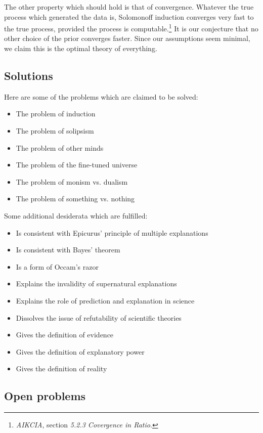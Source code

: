 The other property which should hold is that of convergence.
Whatever the true process which generated the data is, Solomonoff induction converges very fast to the true process, provided the process is computable.\footnote{\textit{AIKCIA}, section \textit{5.2.3 Covergence in Ratio}.}
It is our conjecture that no other choice of the prior converges faster.
Since our assumptions seem minimal, we claim this is the optimal theory of everything.

\newpage

\subsection{Solutions}

Here are some of the problems which are claimed to be solved:

\begin{itemize}
\item The problem of induction
\item The problem of solipsism
\item The problem of other minds
\item The problem of the fine-tuned universe
\item The problem of monism vs. dualism
\item The problem of something vs. nothing
\end{itemize}

\noindent
Some additional desiderata which are fulfilled:

\begin{itemize}
\item Is consistent with Epicurus' principle of multiple explanations
\item Is consistent with Bayes' theorem
\item Is a form of Occam's razor
\item Explains the invalidity of supernatural explanations
\item Explains the role of prediction and explanation in science
\item Dissolves the issue of refutability of scientific theories
\item Gives the definition of evidence
\item Gives the definition of explanatory power
\item Gives the definition of reality
\end{itemize}

\newpage

\subsection{Open problems}

